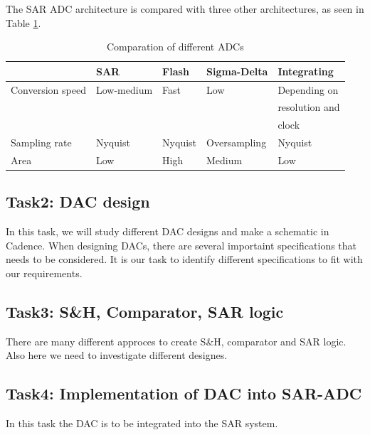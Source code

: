 \documentclass[english, 12pt, a4paper]{article}
\begin{document}
The SAR ADC architecture is compared with three other architectures, as seen in Table \ref{comp:adc}.
\begin{table}[!ht]
\centering

\begin{tabular}{|l|l|l|l|l|}
\hline
                 & SAR        & Flash   & Sigma-Delta  & Integrating                      \\ \hline
Conversion speed & Low-medium & Fast    & Low          & Depending on 			  \\ 
		 &	      &		&	       & resolution and			  \\
		 &	      &		&	       & clock				  \\ \hline
Sampling rate    & Nyquist    & Nyquist & Oversampling & Nyquist                          \\ \hline
Area             & Low        & High    & Medium       & Low                              \\ \hline
\end{tabular}
\caption{Comparation of different ADCs}
\label{comp:adc}
\end{table}

\subsection*{Task2: DAC design}
In this task, we will study different DAC designs and make a schematic in Cadence. When designing DACs, there are several importaint specifications that needs to be considered. It is
our task to identify different specifications to fit with our requirements.

\subsection*{Task3: S\&H, Comparator, SAR logic}
There are many different approces to create S\&H, comparator and SAR logic. Also here we need to investigate different designes.


\subsection*{Task4: Implementation of DAC into SAR-ADC}
In this task the DAC is to be integrated into the SAR system. 
\end{document}
